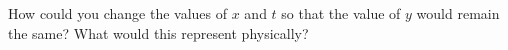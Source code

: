 How could you change the values of $x$ and $t$ so that the value of
$y$ would remain the same? What would this represent physically?   
